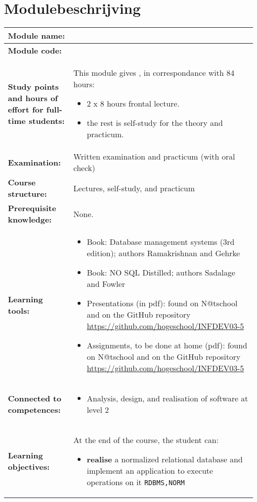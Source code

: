 \section*{Modulebeschrijving}
\begin{tabularx}{\textwidth}{|>{\columncolor{lichtGrijs}} p{}|X|}
	\hline
	\textbf{Module name:} & \modulenaam\\
	\hline
	\textbf{Module code: }& \modulecode\\
	\hline
	\textbf{Study points \newline and hours of effort for full-time students:} & This module gives \stdPunten, in correspondance with 84 hours:
	\begin{itemize}
		\item 2 x 8 hours frontal lecture.
		\item the rest is self-study for the theory and practicum.
	\end{itemize} \\
	\hline
	\textbf{Examination:} & Written examination and practicum (with oral check) \\
	\hline
	\textbf{Course structure:} & Lectures, self-study, and practicum \\
	\hline
	\textbf{Prerequisite knowledge:} & None. \\
	\hline
	\textbf{Learning tools:}  &
		\begin{itemize}
			\item Book: Database management systems (3rd edition); authors Ramakrishnan and Gehrke
			\item Book: NO SQL Distilled; authors Sadalage and Fowler
			\item Presentations (in pdf): found on N@tschool and on the GitHub repository \url{https://github.com/hogeschool/INFDEV03-5}
			\item Assignments, to be done at home (pdf): found on N@tschool and on the GitHub repository \url{https://github.com/hogeschool/INFDEV03-5}
		\end{itemize} \\
	\hline
	\textbf{Connected to \newline competences:} &
		\begin{itemize}
			\item Analysis, design, and realisation of software at level 2
		\end{itemize} \\
	\hline
	\textbf{Learning objectives:} &
		At the end of the course, the student can:
			\begin{itemize}
				\item \textbf{realise} a normalized relational database and implement an application to execute operations on it \texttt{RDBMS,NORM}


\end{itemize}
\end{tabularx}
